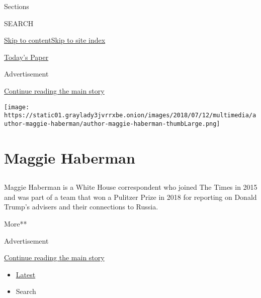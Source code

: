 Sections

SEARCH

\protect\hyperlink{site-content}{Skip to
content}\protect\hyperlink{site-index}{Skip to site index}

\href{https://myaccount.nytimes3xbfgragh.onion/auth/login?response_type=cookie\&client_id=vi}{}

\href{https://www.nytimes3xbfgragh.onion/section/todayspaper}{Today's
Paper}

Advertisement

\protect\hyperlink{after-top}{Continue reading the main story}

\texttt{[image: https://static01.graylady3jvrrxbe.onion/images/2018/07/12/multimedia/author-maggie-haberman/author-maggie-haberman-thumbLarge.png]}

\hypertarget{maggie-haberman}{%
\section{Maggie Haberman}\label{maggie-haberman}}

\hypertarget{section}{%
\subsection{}\label{section}}

Maggie Haberman is a White House correspondent who joined The Times in
2015 and was part of a team that won a Pulitzer Prize in 2018 for
reporting on Donald Trump's advisers and their connections to Russia.

More**

Advertisement

\protect\hyperlink{after-mid1}{Continue reading the main story}

\begin{itemize}
\tightlist
\item
  \protect\hyperlink{stream-panel}{Latest}
\item
  Search
\end{itemize}

